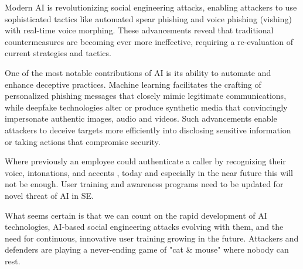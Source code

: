 Modern AI is revolutionizing social engineering attacks, enabling attackers to use sophisticated tactics like automated spear phishing and voice phishing (vishing) with real-time voice morphing. These advancements reveal that traditional countermeasures are becoming ever more ineffective, requiring a re-evaluation of current strategies and tactics.


One of the most notable contributions of AI is its ability to automate and enhance deceptive practices. Machine learning facilitates the crafting of personalized phishing messages that closely mimic legitimate communications, while deepfake technologies alter or produce synthetic media that convincingly impersonate authentic images, audio and videos. Such advancements enable attackers to deceive targets more efficiently into disclosing sensitive information or taking actions that compromise security.

Where previously an employee could authenticate a caller by recognizing their voice, intonations, and accents \citep{mitnickArtDeceptionControlling2003}, today and especially in the near future this will not be enough. User training and awareness programs need to be updated for novel threat of AI in SE.

What seems certain is that we can count on the rapid development of AI technologies, AI-based social engineering attacks evolving with them, and the need for continuous, innovative user training growing in the future. Attackers and defenders are playing a never-ending game of "cat \& mouse" where nobody can rest.



